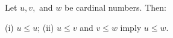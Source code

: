 Let $u, v,$ and $w$ be cardinal numbers. Then:

(i) $u \leq u$;
(ii) $u \leq v$ and $v \leq w$ imply $u \leq w$.